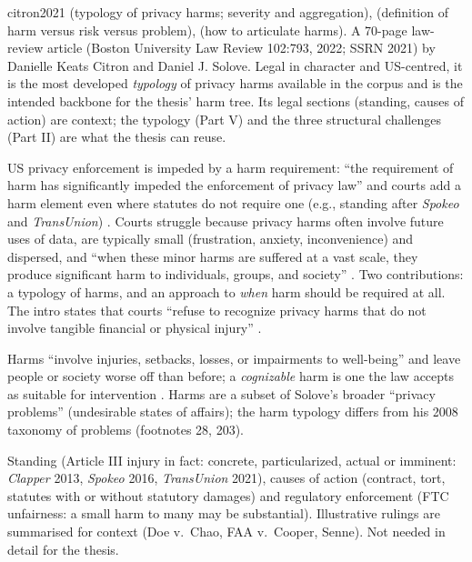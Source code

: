 \begin{papercard}{citron2021}
  (typology of privacy harms; severity and aggregation),  (definition of harm versus risk versus problem),  (how to articulate harms). A 70-page law-review article (Boston University Law Review 102:793, 2022; SSRN 2021) by Danielle Keats Citron and Daniel J. Solove. Legal in character and US-centred, it is the most developed \emph{typology} of privacy harms available in the corpus and is the intended backbone for the thesis' harm tree. Its legal sections (standing, causes of action) are context; the typology (Part V) and the three structural challenges (Part II) are what the thesis can reuse.

 US privacy enforcement is impeded by a harm requirement: ``the requirement of harm has significantly impeded the enforcement of privacy law'' and courts add a harm element even where statutes do not require one (e.g., standing after \emph{Spokeo} and \emph{TransUnion}) . Courts struggle because privacy harms often involve future uses of data, are typically small (frustration, anxiety, inconvenience) and dispersed, and ``when these minor harms are suffered at a vast scale, they produce significant harm to individuals, groups, and society'' . Two contributions: a typology of harms, and an approach to \emph{when} harm should be required at all. The intro states that courts ``refuse to recognize privacy harms that do not involve tangible financial or physical injury'' .

 Harms ``involve injuries, setbacks, losses, or impairments to well-being'' and leave people or society worse off than before; a \emph{cognizable} harm is one the law accepts as suitable for intervention . Harms are a subset of Solove's broader ``privacy problems'' (undesirable states of affairs); the harm typology differs from his 2008 taxonomy of problems (footnotes 28, 203).

 Standing (Article III injury in fact: concrete, particularized, actual or imminent: \emph{Clapper} 2013, \emph{Spokeo} 2016, \emph{TransUnion} 2021), causes of action (contract, tort, statutes with or without statutory damages) and regulatory enforcement (FTC unfairness: a small harm to many may be substantial). Illustrative rulings are summarised for context (Doe v.\ Chao, FAA v.\ Cooper, Senne). Not needed in detail for the thesis.


\end{papercard}
